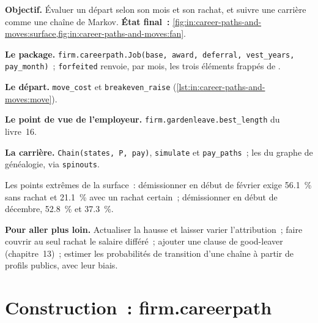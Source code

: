 \begin{tutorial}
\textbf{Objectif.} Évaluer un départ selon son mois et son rachat, et suivre une carrière comme une chaîne de Markov.
\textbf{État final~:} \cref{fig:in:career-paths-and-moves:surface,fig:in:career-paths-and-moves:fan}.
\begin{tutsteps}
\item \textbf{Le package.} \texttt{firm.careerpath.Job(base, award, deferral, vest\_years, pay\_month)}~; \texttt{forfeited}
renvoie, par mois, les trois éléments frappés de .
\item \textbf{Le départ.} \texttt{move\_cost} et \texttt{breakeven\_raise} (\cref{lst:in:career-paths-and-moves:move}).
\label{lst:in:career-paths-and-moves:move}
\item \textbf{Le point de vue de l'employeur.} \texttt{firm.gardenleave.best\_length} du livre~16.
\item \textbf{La carrière.} \texttt{Chain(states, P, pay)}, \texttt{simulate} et \texttt{pay\_paths}~; les  du graphe de
généalogie, via \texttt{spinouts}.
\end{tutsteps}
\end{tutorial}

Les points extrêmes de la surface~: démissionner en début de février exige 56.1~\% sans rachat et 21.1~\% avec un rachat certain~;
démissionner en début de décembre, 52.8~\% et 37.3~\%.

\textbf{Pour aller plus loin.} Actualiser la hausse et laisser varier l'attribution~; faire couvrir au seul rachat le salaire différé~; ajouter
une clause de good-leaver (chapitre~13)~; estimer les probabilités de transition d'une chaîne à partir de profils publics, avec leur biais.

\section{Construction~: firm.careerpath}\label{bld:in:career-paths-and-moves:careerpath}

